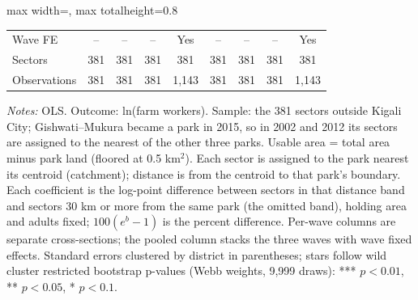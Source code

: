 \documentclass[11pt]{article}
\begin{document}
\begin{table}[H]
\begin{adjustbox}{max width=\textwidth, max totalheight=0.8\textheight}
\begin{tabular}{lcccccccc}
Wave FE & -- & -- & -- & Yes & -- & -- & -- & Yes \\
Sectors & 381 & 381 & 381 & 381 & 381 & 381 & 381 & 381 \\
Observations & 381 & 381 & 381 & 1,143 & 381 & 381 & 381 & 1,143 \\
\bottomrule
\end{tabular}
\end{adjustbox}
\begin{minipage}{0.97\textwidth}\scriptsize
\textit{Notes:} OLS. Outcome: ln(farm workers). Sample: the 381 sectors outside Kigali City; Gishwati--Mukura became a park in 2015, so in 2002 and 2012 its sectors are assigned to the nearest of the other three parks. Usable area = total area minus park land (floored at 0.5 km$^2$). Each sector is assigned to the park nearest its centroid (catchment); distance is from the centroid to that park's boundary. Each coefficient is the log-point difference between sectors in that distance band and sectors 30 km or more from the same park (the omitted band), holding area and adults fixed; $100(e^{b}-1)$ is the percent difference. Per-wave columns are separate cross-sections; the pooled column stacks the three waves with wave fixed effects. Standard errors clustered by district in parentheses; stars follow wild cluster restricted bootstrap p-values (Webb weights, 9,999 draws): *** $p<0.01$, ** $p<0.05$, * $p<0.1$.
\end{minipage}
\end{table}
\clearpage
\end{document}
